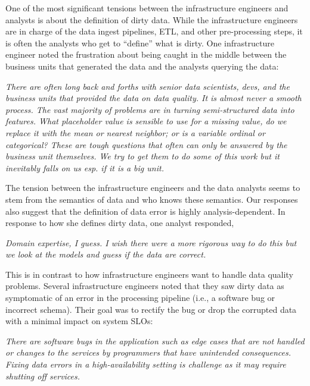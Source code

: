 One of the most significant tensions between the infrastructure engineers and analysts is about the definition of dirty data. While the infrastructure engineers are in charge of the data ingest pipelines, ETL, and other pre-processing steps, it is often the analysts who get to ``define'' what is dirty. One infrastructure engineer noted the frustration about being caught in the middle between the business units that generated the data and the analysts querying the data:

\vspace{0.5em}
\emph{There are often long back and forths with senior data scientists, devs, and the business units that provided the data on data quality. It is almost never a smooth process. The vast majority of problems are in turning semi-structured data into features. What placeholder value is sensible to use for a missing value, do we replace it with the mean or nearest neighbor; or is a variable ordinal or categorical? These are tough questions that often can only be answered by the business unit themselves. We try to get them to do some of this work but it inevitably falls on us esp. if it is a big unit.}

\vspace{0.5em}

The tension between the infrastructure engineers and the data analysts seems to stem from the semantics of data and who knows these semantics. Our responses also suggest that the definition of data error is highly analysis-dependent. In response to how she defines dirty data, one analyst responded,

\vspace{0.5em}
\emph{Domain expertise, I guess. I wish there were a more rigorous way to do this but we look at the models and guess if the data are correct.}

\vspace{0.5em}

This is in contrast to how infrastructure engineers want to handle data quality problems. 
Several infrastructure engineers noted that they saw dirty data as symptomatic of an error in the processing pipeline (i.e., a software bug or incorrect schema). Their goal was to rectify the bug or drop the corrupted data with a minimal impact on system SLOs:

\vspace{0.5em}
\emph{There are software bugs in the application such as edge cases that are not handled or changes to the services by programmers that have unintended consequences. Fixing data errors in a high-availability setting is challenge as it may require shutting off services.}

